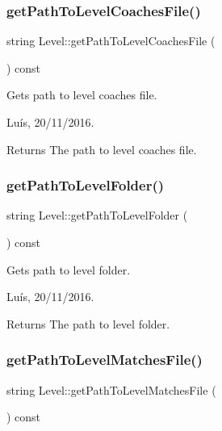 \subsubsection{\texorpdfstring{get\+Path\+To\+Level\+Coaches\+File()}{getPathToLevelCoachesFile()}}
{\footnotesize\ttfamily string Level\+::get\+Path\+To\+Level\+Coaches\+File (\begin{DoxyParamCaption}{ }\end{DoxyParamCaption}) const}



Gets path to level coaches file. 

Luís, 20/11/2016. 

\begin{DoxyReturn}{Returns}
The path to level coaches file. 
\end{DoxyReturn}
\hypertarget{class_level_a66ee534fb23e363ccba422c64f08a202}{}\label{class_level_a66ee534fb23e363ccba422c64f08a202} 
\subsubsection{\texorpdfstring{get\+Path\+To\+Level\+Folder()}{getPathToLevelFolder()}}
{\footnotesize\ttfamily string Level\+::get\+Path\+To\+Level\+Folder (\begin{DoxyParamCaption}{ }\end{DoxyParamCaption}) const}



Gets path to level folder. 

Luís, 20/11/2016. 

\begin{DoxyReturn}{Returns}
The path to level folder. 
\end{DoxyReturn}
\hypertarget{class_level_ac4cd1f4a5c87dbd2b47c1d07cbf114e4}{}\label{class_level_ac4cd1f4a5c87dbd2b47c1d07cbf114e4} 
\subsubsection{\texorpdfstring{get\+Path\+To\+Level\+Matches\+File()}{getPathToLevelMatchesFile()}}
{\footnotesize\ttfamily string Level\+::get\+Path\+To\+Level\+Matches\+File (\begin{DoxyParamCaption}{ }\end{DoxyParamCaption}) const}



